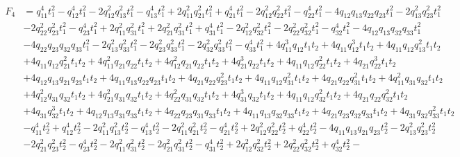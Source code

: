 \documentclass[10pt]{amsart}
\theoremstyle{definition}
\theoremstyle{corollary}
\theoremstyle{remark}
\theoremstyle{conclusion}
\begin{document}
{\small \begin{equation}
\begin{split}
F_4&=q_{11}^4 t_{1}^2 - q_{12}^4 t_{1}^2 - 2 q_{12}^2 q_{13}^2 t_{1}^2 - q_{13}^4 t_{1}^2 + 
2 q_{11}^2 q_{21}^2 t_{1}^2 + q_{21}^4 t_{1}^2 - 2 q_{12}^2 q_{22}^2 t_{1}^2 - q_{22}^4 t_{1}^2 - 
4 q_{12} q_{13} q_{22} q_{23} t_{1}^2 - 2 q_{13}^2 q_{23}^2 t_{1}^2 \\
&- 2 q_{22}^2 q_{23}^2 t_{1}^2 - 
q_{23}^4 t_{1}^2 + 2 q_{11}^2 q_{31}^2 t_{1}^2 + 2 q_{21}^2 q_{31}^2 t_{1}^2 + q_{31}^4 t_{1}^2 - 
2 q_{12}^2 q_{32}^2 t_{1}^2 - 2 q_{22}^2 q_{32}^2 t_{1}^2 - q_{32}^4 t_{1}^2 - 
4 q_{12} q_{13} q_{32} q_{33} t_{1}^2 \\
&- 4 q_{22} q_{23} q_{32} q_{33} t_{1}^2 - 
2 q_{13}^2 q_{33}^2 t_{1}^2 - 2 q_{23}^2 q_{33}^2 t_{1}^2 - 2 q_{32}^2 q_{33}^2 t_{1}^2 - 
q_{33}^4 t_{1}^2 + 4 q_{11}^3 q_{12} t_{1} t_{2} + 4 q_{11} q_{12}^3 t_{1} t_{2} + 
4 q_{11} q_{12} q_{13}^2 t_{1} t_{2} \\
&+ 4 q_{11} q_{12} q_{21}^2 t_{1} t_{2} + 
4 q_{11}^2 q_{21} q_{22} t_{1} t_{2} + 4 q_{12}^2 q_{21} q_{22} t_{1} t_{2} + 4 q_{21}^3 q_{22} t_{1} t_{2} + 
4 q_{11} q_{12} q_{22}^2 t_{1} t_{2} + 4 q_{21} q_{22}^3 t_{1} t_{2} \\
&+ 
4 q_{12} q_{13} q_{21} q_{23} t_{1} t_{2} + 4 q_{11} q_{13} q_{22} q_{23} t_{1} t_{2} + 
4 q_{21} q_{22} q_{23}^2 t_{1} t_{2} + 4 q_{11} q_{12} q_{31}^2 t_{1} t_{2} + 
4 q_{21} q_{22} q_{31}^2 t_{1} t_{2} + 4 q_{11}^2 q_{31} q_{32} t_{1} t_{2} \\
&+ 
4 q_{12}^2 q_{31} q_{32} t_{1} t_{2} + 4 q_{21}^2 q_{31} q_{32} t_{1} t_{2} + 
4 q_{22}^2 q_{31} q_{32} t_{1} t_{2} + 4 q_{31}^3 q_{32} t_{1} t_{2} + 4 q_{11} q_{12} q_{32}^2 t_{1} t_{2} + 
4 q_{21} q_{22} q_{32}^2 t_{1} t_{2} \\
&+ 4 q_{31} q_{32}^3 t_{1} t_{2} + 4 q_{12} q_{13} q_{31} q_{33} t_{1} t_{2} + 4 q_{22} q_{23} q_{31} q_{33} t_{1} t_{2} + 
4 q_{11} q_{13} q_{32} q_{33} t_{1} t_{2} + 4 q_{21} q_{23} q_{32} q_{33} t_{1} t_{2} + 
4 q_{31} q_{32} q_{33}^2 t_{1} t_{2} \\
&- q_{11}^4 t_{2}^2 + q_{12}^4 t_{2}^2 - 
2 q_{11}^2 q_{13}^2 t_{2}^2 - q_{13}^4 t_{2}^2 - 2 q_{11}^2 q_{21}^2 t_{2}^2 - q_{21}^4 t_{2}^2 + 
2 q_{12}^2 q_{22}^2 t_{2}^2 + q_{22}^4 t_{2}^2 - 4 q_{11} q_{13} q_{21} q_{23} t_{2}^2 - 
2 q_{13}^2 q_{23}^2 t_{2}^2 \\
&- 2 q_{21}^2 q_{23}^2 t_{2}^2 - q_{23}^4 t_{2}^2 - 
2 q_{11}^2 q_{31}^2 t_{2}^2 - 2 q_{21}^2 q_{31}^2 t_{2}^2 - q_{31}^4 t_{2}^2 + 
2 q_{12}^2 q_{32}^2 t_{2}^2 + 2 q_{22}^2 q_{32}^2 t_{2}^2 + q_{32}^4 t_{2}^2 - 

\end{split}
\end{equation}}
\end{document}
